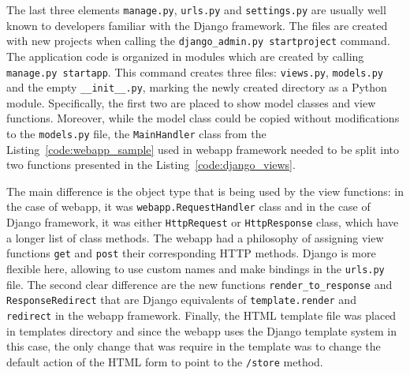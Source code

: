The last three elements \texttt{manage.py}, \texttt{urls.py} and \texttt{settings.py} are usually well known to developers familiar with the Django framework. The files are created with new projects when calling the \texttt{django\_admin.py startproject} command. The application code is organized in modules which are created by calling \texttt{manage.py startapp}. This command creates three files: \texttt{views.py}, \texttt{models.py} and the empty \texttt{\_\_init\_\_.py}, marking the newly created directory as a Python module. Specifically, the first two are placed to show model classes and view functions. Moreover, while the model class could be copied without modifications to the \texttt{models.py} file, the \texttt{MainHandler} class from the Listing~\ref{code:webapp_sample} used in webapp framework needed to be split into two functions presented in the Listing~\ref{code:django_views}.

The main difference is the object type that is being used by the view functions: in the case of webapp, it was \texttt{webapp.RequestHandler} class and in the case of Django framework, it was either \texttt{HttpRequest} or \texttt{HttpResponse} class, which have a longer list of class methods. The webapp had a philosophy of assigning view functions \texttt{get} and \texttt{post} their corresponding HTTP methods. Django is more flexible here, allowing to use custom names and make bindings in the \texttt{urls.py} file. The second clear difference are the new functions \texttt{render\_to\_response} and \linebreak \texttt{ResponseRedirect} that are Django equivalents of \texttt{template.render} and \texttt{redirect} in the webapp framework. Finally, the HTML template file  was placed in templates directory and since the webapp uses the Django template system in this case, the only change that was require in the template was to change the default action of the HTML form to point to the \texttt{/store} method.

